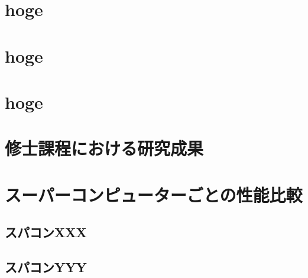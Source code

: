 \documentclass[
    openany,oneside,
    paper=a4paper,      %
    book,               %
    fontsize=12pt,      %
    jafontsize=12pt,    %
    head_space=33mm,    %
    foot_space=30mm,    %
    gutter=25mm,        %
    fore-edge=10mm      %
    ]{jlreq}            %
\begin{document}
\chapter{hoge}

\chapter{hoge}

\chapter{hoge}





\acknowledge

\lipsum[1-8]


% 
% 

\appendix
\label{ch:app}
\pagestyle{appendix}

\chapter{修士課程における研究成果}
\label{ch:app_master}

\lipsum[1-8]

\chapter{スーパーコンピューターごとの性能比較}
\label{ch:app_sx}

\lipsum[1-2]

\section{スパコンXXX}
\label{sec:app_xxx}

\lipsum[1-4]

\section{スパコンYYY}
\label{sec:app_yyy}

\lipsum[1-4]


\end{document}
